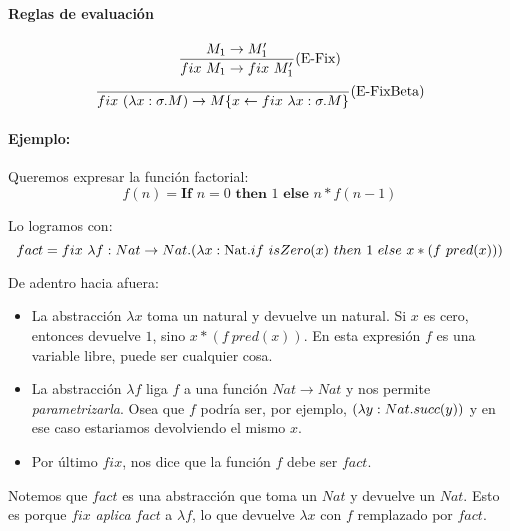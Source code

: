 \paragraph{Reglas de evaluación}
\begin{equation*}
	\frac{M_1\to M'_1}{fix~M_1\to fix~M'_1}(\text{E-Fix})
\end{equation*}
\vspace*{5mm}
\begin{equation*}
	\frac{}{fix~(\lambda x: \sigma . M)\to M\{x\leftarrow fix~\lambda x: \sigma . M\}}(\text{E-FixBeta})
\end{equation*}

\paragraph{Ejemplo:} Queremos expresar la función factorial:
$$f(n) = \textbf{If } n=0 \textbf{ then } 1 \textbf{ else } n*f(n-1)$$

Lo logramos con:
$$fact = fix~\lambda f: Nat\rightarrow Nat . (\lambda x: \text{Nat} . if~ isZero(x)~ then~ 1~ else~ x*(f~pred(x)))$$

De adentro hacia afuera:
\begin{itemize}
	\item La abstracción $\lambda x$ toma un natural y devuelve un natural. Si $x$ es cero, entonces devuelve $1$, sino $x*(f~pred(x))$. En esta expresión $f$ es una variable libre, puede ser cualquier cosa.
	\item La abstracción $\lambda f$ liga $f$ a una función $Nat\to Nat$ y nos permite \textit{parametrizarla}. Osea que $f$ podría ser, por ejemplo, $(\lambda y: Nat . succ(y))$ y en ese caso estariamos devolviendo el mismo $x$.
	\item Por último $fix$, nos dice que la función $f$ debe ser $fact$.
\end{itemize}

Notemos que $fact$ es una abstracción que toma un $Nat$ y devuelve un $Nat$. Esto es porque $fix$ \textit{aplica} $fact$ a $\lambda f$, lo que devuelve $\lambda x$ con $f$ remplazado por $fact$.
